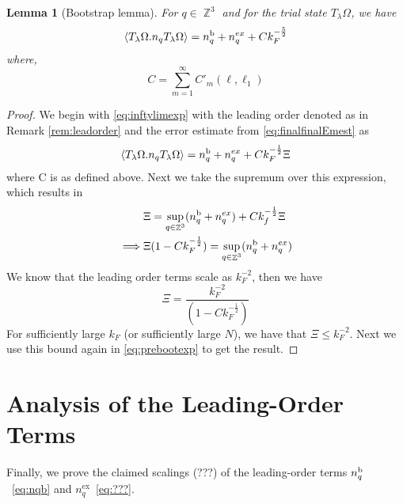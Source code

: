 \documentclass[12pt,a4paper]{article}
\numberwithin{equation}{section}
\newcommand{\1}{\mathbb{I}}
\renewcommand{\b}{\textnormal{b}}
\newcommand{\ex}{\mathrm{ex}}
\DeclareMathOperator{\Z}{\mathbb{Z}}
\newcommand{\eva}[1]{\left\langle #1 \right\rangle}
\theoremstyle{plain}
\newtheorem{lemma}[theorem]{Lemma}
\theoremstyle{definition}
\theoremstyle{remark}
\theoremstyle{plain}
\theoremstyle{definition}
\theoremstyle{remark}
\begin{document}
\begin{lemma}[Bootstrap lemma]
	For $q \in \Z^3$ and for the trial state $T_{\lambda}\Omega$, we have 
	\begin{equation}
		\eva{ T_{\lambda}\Omega. n_q T_{\lambda}\Omega} = n_q^{\b} + n_q^{ex} + C k_F^{-\frac{5}{2}}
	\end{equation}
where, 
\begin{equation}
	C = \sum\limits_{m=1}^\infty C'_m(\ell,\ell_1)
\end{equation}
\end{lemma}
\begin{proof}
	We begin with \eqref{eq:inftylimexp} with the leading order denoted as in Remark \ref{rem:leadorder} and the error estimate from \eqref{eq:finalfinalEmest} as
	\begin{equation}\label{eq:prebootexp}
		\eva{ T_{\lambda}\Omega. n_q T_{\lambda}\Omega} = n_q^{\b} + n_q^{ex} + C k_F^{-\frac{1}{2}}\Xi
\end{equation}
where C is as defined above. Next we take the supremum over this expression, which results in
\begin{align}
	&\Xi = \sup_{q \in \Z^3}(n_q^{\b} + n_q^{ex}) + C k_f^{-\frac{1}{2}}\Xi \nonumber\\
	\implies &\Xi(1 - Ck_F^{-\frac{1}{2}}) = \sup_{q \in \Z^3}(n_q^{\b} + n_q^{ex})
\end{align}
We know that the leading order terms scale as $k_F^{-2}$, then we have 
\begin{equation}
	\Xi = \frac{k_F^{-2}}{(1 - Ck_F^{-\frac{1}{2}})}
\end{equation}
For sufficiently large $k_F$ (or sufficiently large $N$), we have that $\Xi\leq k_F^{-2}$. Next we use this bound again in \eqref{eq:prebootexp} to get the result.
\end{proof}



\section{Analysis of the Leading-Order Terms}
\label{sec:leading_order_analysis}


Finally, we prove the claimed scalings (???) of the leading-order terms $ n_q^{\b} $~\eqref{eq:nqb} and $ n_q^{\ex} $~\eqref{eq:???}.
\end{document}
